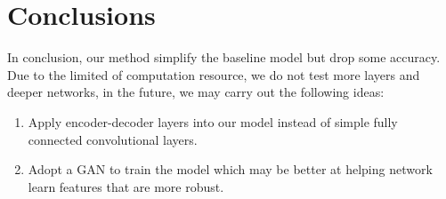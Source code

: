 \documentclass[final]{cvpr}
\begin{document}
\section{Conclusions}
In conclusion, our method simplify the baseline model but drop some accuracy. Due to the limited of computation resource, we do not test more layers and deeper networks, in the future, we may carry out the following ideas:
\begin{enumerate}
\item Apply encoder-decoder layers into our model instead of simple fully connected convolutional layers.
\item Adopt a GAN to train the model which may be better at helping network learn features that are more robust. 
\end{enumerate}




\end{document}
